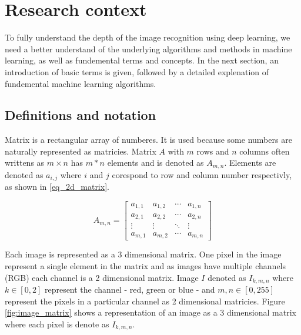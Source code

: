\documentclass[times, utf8, diplomski]{fer}
\begin{document}
\chapter{Research context}
To fully understand the depth of the image recognition using deep learning, we need a better understand of the underlying algorithms and methods in machine learning, as well as fundemental terms and concepts. In the next section, an introduction of basic terms is given, followed by a detailed explenation of fundemental machine learning algorithms.

\section{Definitions and notation}
Matrix is a rectangular array of numberes. It is used because some numbers are naturally represented as matricies. Matrix $A$ with $m$ rows and $n$ columns often writtens as $m \times n$ has $m*n$ elements and is denoted as $A_{m,n}$. Elements are denoted as $a_{i,j}$ where $i$ and $j$ corespond to row and column number respectivly, as shown in \ref{eq_2d_matrix}. 

\begin{equation} \label{eq_2d_matrix}
A_{m,n} = 
 \begin{bmatrix}
  a_{1,1} & a_{1,2} & \cdots & a_{1,n} \\
  a_{2,1} & a_{2,2} & \cdots & a_{2,n} \\
  \vdots  & \vdots  & \ddots & \vdots  \\
  a_{m,1} & a_{m,2} & \cdots & a_{m,n} 
 \end{bmatrix}
\end{equation}

Each image is represented as a 3 dimensional matrix. One pixel in the image represent a single element in the matrix and as images have multiple channels (RGB) each channel is a 2 dimensional matrix. Image $I$ denoted as $I_{k,m,n}$ where $k\in[0,2]$ represent the channel - red, green or blue - and $m,n\in[0,255]$ represent the pixels in a particular channel as 2 dimensional matricies. Figure \ref{fig:image_matrix} shows a representation of an image as a 3 dimensional matrix where each pixel is denote as $I_{k,m,n}$.
\end{document}
